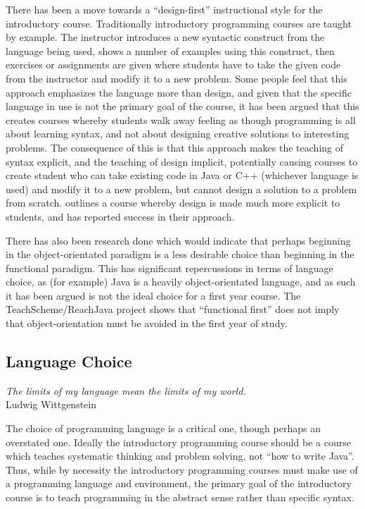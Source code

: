 There has been a move towards a ``design-first'' instructional style for the introductory course.  Traditionally introductory programming courses are taught by example.  The instructor introduces a new syntactic construct from the language being used, shows a number of examples using this construct, then exercises or assignments are given where students have to take the given code from the instructor and modify it to a new problem.  Some people feel that this approach emphasizes the language more than design, and given that the specific language in use is not the primary goal of the course, it has been argued that this creates courses whereby students walk away feeling as though programming is all about learning syntax, and not about designing creative solutions to interesting problems.  The consequence of this is that this approach makes the teaching of syntax explicit, and the teaching of design implicit, potentially causing courses to create student who can take existing code in Java or C++ (whichever language is used) and modify it to a new problem, but cannot design a solution to a problem from scratch.  \cite{Flatt04} outlines a course whereby design is made much more explicit to students, and has reported success in their approach.

There has also been research done which would indicate that perhaps beginning in the object-orientated paradigm is a less desirable choice than beginning in the functional paradigm\cite{Flatt04,Huch05}.  This has significant repercussions in terms of language choice, as (for example) Java is a heavily object-orientated language, and as such it has been argued is not the ideal choice for a first year course\cite{Bos98,Huch05}.  The TeachScheme/ReachJava project shows that ``functional first'' does not imply that object-orientation must be avoided in the first year of study\cite{Bloch08,teachScheme,Felleisen04}.


\subsection{Language Choice}

\begin{flushright}
\textit{The limits of my language mean the limits of my world.}
\\
Ludwig Wittgenstein \cite{Wittgenstein22} \\
\end{flushright}

The choice of programming language is a critical one, though perhaps an overstated one.  Ideally the introductory programming course should be a course which teaches systematic thinking and problem solving, not ``how to write Java''.  Thus, while by necessity the introductory programming courses must make use of a programming language and environment, the primary goal of the introductory course is to teach programming in the abstract sense rather than specific syntax.


